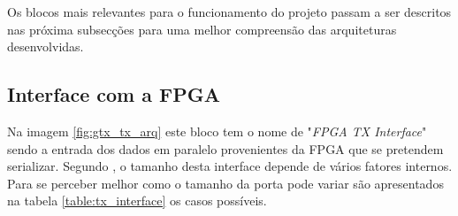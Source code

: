 Os blocos mais relevantes para o funcionamento do projeto passam a ser descritos nas próxima subsecções para uma melhor compreensão das arquiteturas desenvolvidas.

\subsection{Interface com a FPGA} \label{subch:tx_interface}

Na imagem \ref{fig:gtx_tx_arq} este bloco tem o nome de "\textit{FPGA TX Interface}" sendo a entrada dos dados em paralelo provenientes da FPGA que se pretendem serializar. Segundo \cite{R011}, o tamanho desta interface depende de vários fatores internos. Para se perceber melhor como o tamanho da porta pode variar são apresentados na tabela \ref{table:tx_interface} os casos possíveis.


